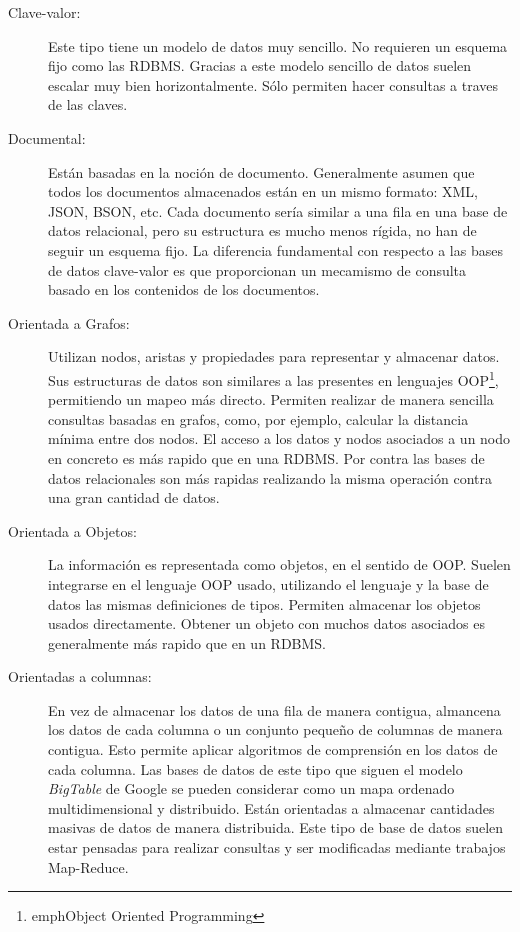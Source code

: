 \begin{description}
\item[Clave-valor:] Este tipo tiene un modelo de datos muy
  sencillo. No requieren un esquema fijo como las RDBMS. Gracias a
  este modelo sencillo de datos suelen escalar muy bien
  horizontalmente. Sólo permiten hacer consultas a traves de las
  claves.

\item[Documental:] Están basadas en la noción de
  documento. Generalmente asumen que todos los documentos almacenados
  están en un mismo formato: XML, JSON, BSON, etc. Cada documento
  sería similar a una fila en una base de datos relacional, pero su
  estructura es mucho menos rígida, no han de seguir un esquema
  fijo. La diferencia fundamental con respecto a las bases de datos
  clave-valor es que proporcionan un mecamismo de consulta basado en
  los contenidos de los documentos.

\item[Orientada a Grafos:] Utilizan nodos, aristas y propiedades para
  representar y almacenar datos. Sus estructuras de datos son
  similares a las presentes en lenguajes OOP\footnote{emph{Object
      Oriented Programming}}, permitiendo un mapeo más
  directo. Permiten realizar de manera sencilla consultas basadas en
  grafos, como, por ejemplo, calcular la distancia mínima entre dos
  nodos. El acceso a los datos y nodos asociados a un nodo en concreto
  es más rapido que en una RDBMS. Por contra las bases de datos
  relacionales son más rapidas realizando la misma operación contra
  una gran cantidad de datos.

\item[Orientada a Objetos:] La información es representada como
  objetos, en el sentido de OOP. Suelen integrarse en el lenguaje OOP
  usado, utilizando el lenguaje y la base de datos las mismas
  definiciones de tipos. Permiten almacenar los objetos usados
  directamente. Obtener un objeto con muchos datos asociados es
  generalmente más rapido que en un RDBMS.

\item[Orientadas a columnas:] En vez de almacenar los datos de una
  fila de manera contigua, almancena los datos de cada columna o un
  conjunto pequeño de columnas de manera contigua. Esto permite
  aplicar algoritmos de comprensión en los datos de cada columna. Las
  bases de datos de este tipo que siguen el modelo
  \emph{BigTable}\cite{BIG-TABLE} de Google se pueden considerar como un mapa
  ordenado multidimensional y distribuido. Están orientadas a
  almacenar cantidades masivas de datos de manera distribuida. Este
  tipo de base de datos suelen estar pensadas para realizar consultas
  y ser modificadas mediante trabajos Map-Reduce\cite{MAP-REDUCE}.

\end{description}

